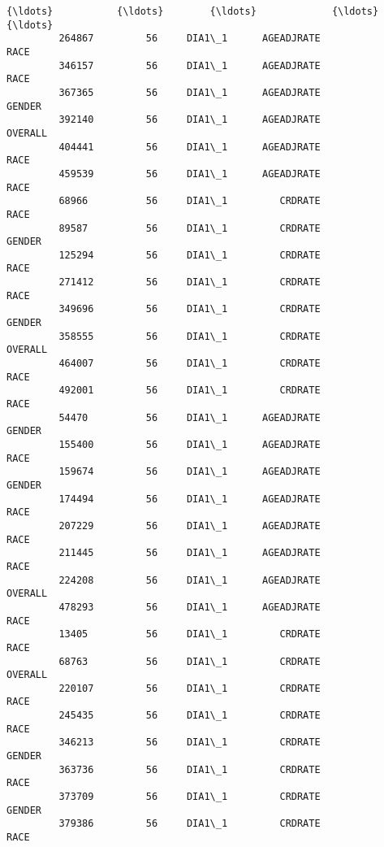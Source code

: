 \documentclass[11pt]{article}
\begin{document}
\begin{Verbatim}[commandchars=\\\{\}]
         {\ldots}           {\ldots}        {\ldots}             {\ldots}                        {\ldots}   
         264867         56     DIA1\_1      AGEADJRATE                       RACE   
         346157         56     DIA1\_1      AGEADJRATE                       RACE   
         367365         56     DIA1\_1      AGEADJRATE                     GENDER   
         392140         56     DIA1\_1      AGEADJRATE                    OVERALL   
         404441         56     DIA1\_1      AGEADJRATE                       RACE   
         459539         56     DIA1\_1      AGEADJRATE                       RACE   
         68966          56     DIA1\_1         CRDRATE                       RACE   
         89587          56     DIA1\_1         CRDRATE                     GENDER   
         125294         56     DIA1\_1         CRDRATE                       RACE   
         271412         56     DIA1\_1         CRDRATE                       RACE   
         349696         56     DIA1\_1         CRDRATE                     GENDER   
         358555         56     DIA1\_1         CRDRATE                    OVERALL   
         464007         56     DIA1\_1         CRDRATE                       RACE   
         492001         56     DIA1\_1         CRDRATE                       RACE   
         54470          56     DIA1\_1      AGEADJRATE                     GENDER   
         155400         56     DIA1\_1      AGEADJRATE                       RACE   
         159674         56     DIA1\_1      AGEADJRATE                     GENDER   
         174494         56     DIA1\_1      AGEADJRATE                       RACE   
         207229         56     DIA1\_1      AGEADJRATE                       RACE   
         211445         56     DIA1\_1      AGEADJRATE                       RACE   
         224208         56     DIA1\_1      AGEADJRATE                    OVERALL   
         478293         56     DIA1\_1      AGEADJRATE                       RACE   
         13405          56     DIA1\_1         CRDRATE                       RACE   
         68763          56     DIA1\_1         CRDRATE                    OVERALL   
         220107         56     DIA1\_1         CRDRATE                       RACE   
         245435         56     DIA1\_1         CRDRATE                       RACE   
         346213         56     DIA1\_1         CRDRATE                     GENDER   
         363736         56     DIA1\_1         CRDRATE                       RACE   
         373709         56     DIA1\_1         CRDRATE                     GENDER   
         379386         56     DIA1\_1         CRDRATE                       RACE   
         

\end{Verbatim}
\end{document}
